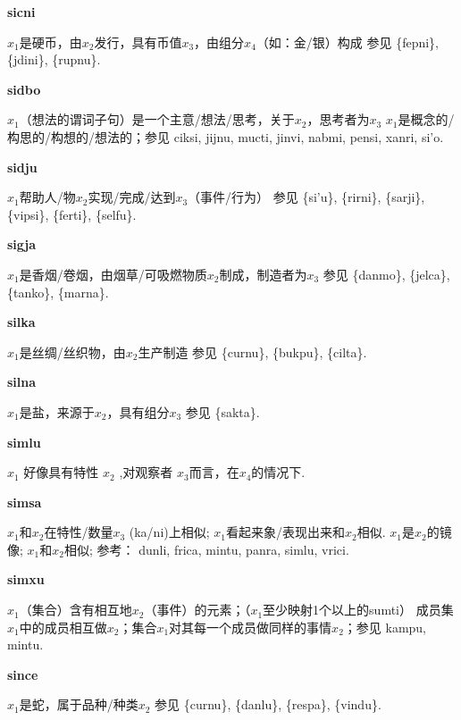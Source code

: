 \documentclass[notitlepage,twocolumn,a4paper,10pt]{book}
\begin{document}
{\sffamily\bfseries sicni}\enspace {\ttfamily\bfseries[        si'i]}  $x_1$是硬币，由$x_2$发行，具有币值$x_3$，由组分$x_4$（如：金\slash{}银）构成 \textemdash{} 参见 \{fepni\}, \{jdini\}, \{rupnu\}.

{\sffamily\bfseries sidbo}\enspace {\ttfamily\bfseries[sib     si'o]}  $x_1$（想法的谓词子句）是一个主意\slash{}想法\slash{}思考，关于$x_2$，思考者为$x_3$ \textemdash{} $x_1$是概念的\slash{}构思的\slash{}构想的\slash{}想法的；参见 {ciksi}, {jijnu}, {mucti}, {jinvi}, {nabmi}, {pensi}, {xanri}, {si'o}.

{\sffamily\bfseries sidju}\enspace {\ttfamily\bfseries[    dju]}  $x_1$帮助人\slash{}物$x_2$实现\slash{}完成\slash{}达到$x_3$（事件\slash{}行为） \textemdash{} 参见 \{si'u\}, \{rirni\}, \{sarji\}, \{vipsi\}, \{ferti\}, \{selfu\}.

{\sffamily\bfseries sigja}\enspace {\ttfamily\bfseries[sig]}  $x_1$是香烟\slash{}卷烟，由烟草\slash{}可吸燃物质$x_2$制成，制造者为$x_3$ \textemdash{} 参见 \{danmo\}, \{jelca\}, \{tanko\}, \{marna\}.

{\sffamily\bfseries silka}\enspace {\ttfamily\bfseries[sik]}  $x_1$是丝绸\slash{}丝织物，由$x_2$生产制造 \textemdash{} 参见 \{curnu\}, \{bukpu\}, \{cilta\}.

{\sffamily\bfseries silna} $x_1$是盐，来源于$x_2$，具有组分$x_3$ \textemdash{} 参见 \{sakta\}.

{\sffamily\bfseries simlu}\enspace {\ttfamily\bfseries[    mlu]}  $x_1$ 好像具有特性 $x_2$ ,对观察者 $x_3$而言，在$x_4$的情况下.

{\sffamily\bfseries simsa}\enspace {\ttfamily\bfseries[    smi]}  $x_1$和$x_2$在特性\slash{}数量$x_3$ (ka\slash{}ni)上相似; $x_1$看起来象\slash{}表现出来和$x_2$相似. \textemdash{}  $x_1$是$x_2$的镜像; $x_1$和$x_2$相似; 参考： {dunli}, {frica}, {mintu}, {panra}, {simlu}, {vrici}.

{\sffamily\bfseries simxu}\enspace {\ttfamily\bfseries[sim     si'u]}  $x_1$（集合）含有相互地$x_2$（事件）的元素；（$x_1$至少映射1个以上的sumti） \textemdash{} 成员集$x_1$中的成员相互做$x_2$；集合$x_1$对其每一个成员做同样的事情$x_2$；参见 {kampu}, {mintu}.

{\sffamily\bfseries since} $x_1$是蛇，属于品种\slash{}种类$x_2$ \textemdash{} 参见 \{curnu\}, \{danlu\}, \{respa\}, \{vindu\}.
\end{document}
